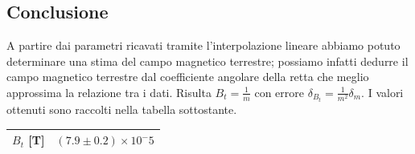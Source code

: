\documentclass[a4paper]{article}
\begin{document}
\subsection{Conclusione}
A partire dai parametri ricavati tramite l'interpolazione lineare abbiamo potuto determinare una stima del campo magnetico terrestre;
possiamo infatti dedurre il campo magnetico terrestre dal coefficiente angolare della retta che meglio approssima la relazione tra i dati.
Risulta \( B_t = \frac {1}{m} \) con errore \( \delta_{B_t} = \frac {1}{m^2}\delta_m \).
I valori ottenuti sono raccolti nella tabella sottostante.

\begin{center}
\begin{tabular}{|l|c|}
\hline
\(B_t\) [T] & $(7.9 \pm 0.2) \times 10^-5$ \\
\hline
\end{tabular}
\end{center}
\end{document}
